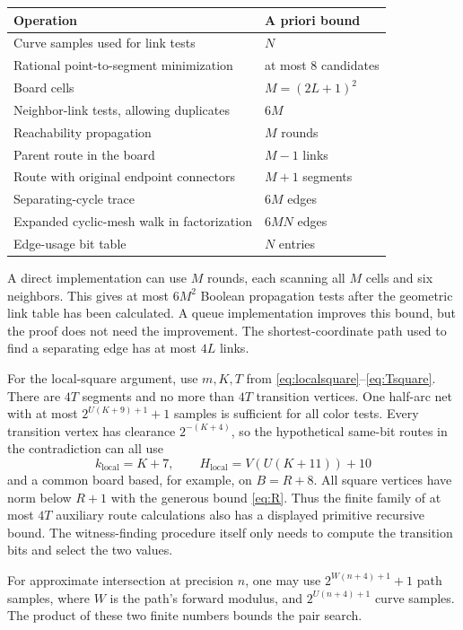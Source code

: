 \begin{center}
\begin{tabular}{@{}p{}p{}@{}}
\toprule
Operation & A priori bound\\
\midrule
Curve samples used for link tests & $N$\\
Rational point-to-segment minimization & at most $8$ candidates\\
Board cells & $M=(2L+1)^2$\\
Neighbor-link tests, allowing duplicates & $6M$\\
Reachability propagation & $M$ rounds\\
Parent route in the board & $M-1$ links\\
Route with original endpoint connectors & $M+1$ segments\\
Separating-cycle trace & $6M$ edges\\
Expanded cyclic-mesh walk in factorization & $6MN$ edges\\
Edge-usage bit table & $N$ entries\\
\bottomrule
\end{tabular}
\end{center}

A direct implementation can use $M$ rounds, each scanning all
$M$ cells and six neighbors. This gives at most $6M^2$
Boolean propagation tests after the geometric link table has
been calculated. A queue implementation improves this bound,
but the proof does not need the improvement.
The shortest-coordinate path used to find a separating edge
has at most $4L$ links.

For the local-square argument, use $m,K,T$ from
\eqref{eq:localsquare}--\eqref{eq:Tsquare}. There are
$4T$ segments and no more than $4T$ transition vertices.
One half-arc net with at most
$2^{U(K+9)+1}+1$ samples is sufficient for all color tests.
Every transition vertex has clearance $2^{-(K+4)}$,
so the hypothetical same-bit routes in the contradiction
can all use
\[
 k_{\mathrm{local}}=K+7,\qquad
 H_{\mathrm{local}}=V(U(K+11))+10
\]
and a common board based, for example, on $B=R+8$.
All square vertices have norm below $R+1$ with the generous
bound \eqref{eq:R}. Thus the finite family of at most $4T$
auxiliary route calculations also has a displayed primitive
recursive bound. The witness-finding procedure itself only
needs to compute the transition bits and select the two values.

For approximate intersection at precision $n$, one may use
$2^{W(n+4)+1}+1$ path samples, where $W$ is the path's forward
modulus, and $2^{U(n+4)+1}$ curve samples. The product of
these two finite numbers bounds the pair search.

